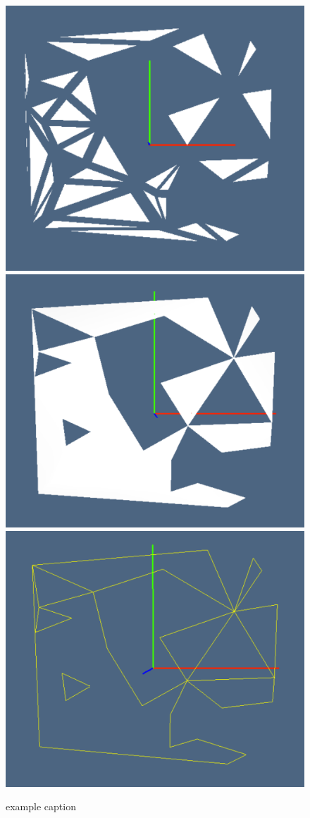 \documentclass[11pt,oneside]{article}	%
\begin{document}
\begin{figure}[htbp] %
   \centering
   \includegraphics[height=0.25\linewidth,width=0.32\linewidth]{images/tria0} 
   \includegraphics[height=0.25\linewidth,width=0.32\linewidth]{images/tria1} 
   \includegraphics[height=0.25\linewidth,width=0.32\linewidth]{images/tria2} 
   \caption{example caption}
   \label{fig:example}
\end{figure}
\end{document}
